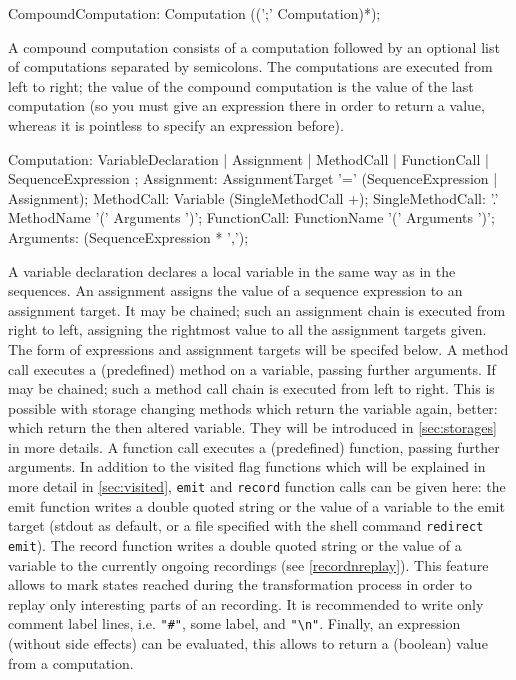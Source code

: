 \begin{rail} 
  CompoundComputation: Computation ((';' Computation)*); 
\end{rail}

A compound computation consists of a computation followed by an optional list of computations separated by semicolons.
The computations are executed from left to right;
the value of the compound computation is the value of the last computation (so you must give an expression there in order to return a value, whereas it is pointless to specify an expression before).

\begin{rail} 
  Computation:
     VariableDeclaration |
     Assignment |
     MethodCall |
     FunctionCall |
     SequenceExpression
  ;
	Assignment:	AssignmentTarget '=' (SequenceExpression | Assignment); 
	MethodCall: Variable (SingleMethodCall +);
	SingleMethodCall: '.' MethodName '(' Arguments ')';
	FunctionCall: FunctionName '(' Arguments ')';
	Arguments: (SequenceExpression * ',');
\end{rail}\label{recstmt}

A variable declaration declares a local variable in the same way as in the sequences.
An assignment assigns the value of a sequence expression to an assignment target.
It may be chained; such an assignment chain is executed from right to left, assigning the rightmost value to all the assignment targets given.
The form of expressions and assignment targets will be specifed below.
A method call executes a (predefined) method on a variable, passing further arguments.
If may be chained; such a method call chain is executed from left to right. 
This is possible with storage changing methods which return the variable again, better: which return the then altered variable. 
They will be introduced in \ref{sec:storages} in more details.
A function call executes a (predefined) function, passing further arguments.
In addition to the visited flag functions which will be explained in more detail in \ref{sec:visited},
\texttt{emit} and \texttt{record} function calls can be given here: the emit function writes a double quoted string or the value of a variable to the emit target (stdout as default, or a file specified with the shell command \texttt{redirect emit}). The record function writes a double quoted string or the value of a variable to the currently ongoing recordings (see \ref{recordnreplay}). This feature allows to mark states reached during the transformation process in order to replay only interesting parts of an recording. It is recommended to write only comment label lines, i.e. \verb/"#"/, some label, and \verb/"\n"/.
Finally, an expression (without side effects) can be evaluated, this allows to return a (boolean) value from a computation.

